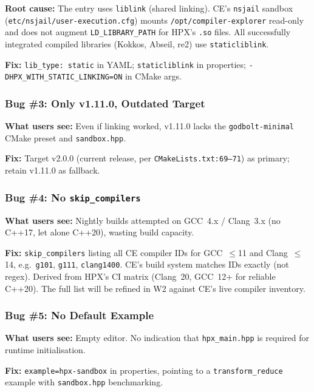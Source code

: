 \documentclass[11pt, a4paper]{article}
\newcommand{\code}[1]{\texttt{#1}}
\newcommand{\cefile}[1]{\texttt{#1}}
\begin{document}
\textbf{Root cause:} The entry uses \code{liblink} (shared linking).
CE's \code{nsjail} sandbox (\cefile{etc/nsjail/user-execution.cfg}) mounts
\code{/opt/compiler-explorer} read-only and does not augment
\code{LD\_LIBRARY\_PATH} for HPX's \code{.so} files.  All successfully
integrated compiled libraries (Kokkos, Abseil, re2) use \code{staticliblink}.

\textbf{Fix:} \code{lib\_type: static} in YAML; \code{staticliblink} in
properties; \code{-DHPX\_WITH\_STATIC\_LINKING=ON} in CMake args.

\subsubsection*{Bug \#3: Only v1.11.0, Outdated Target}

\textbf{What users see:} Even if linking worked, v1.11.0 lacks the
\code{godbolt-minimal} CMake preset and \cefile{sandbox.hpp}.

\textbf{Fix:} Target v2.0.0 (current release, per \cefile{CMakeLists.txt:69--71})
as primary; retain v1.11.0 as fallback.

\subsubsection*{Bug \#4: No \code{skip\_compilers}}

\textbf{What users see:} Nightly builds attempted on GCC~4.x / Clang~3.x
(no C++17, let alone C++20), wasting build capacity.

\textbf{Fix:} \code{skip\_compilers} listing all CE compiler IDs for
GCC~$\leq$11 and Clang~$\leq$14, e.g.\ \code{g101}, \code{g111},
\code{clang1400}.  CE's build system matches IDs exactly (not regex).
Derived from HPX's CI matrix (Clang~20, GCC~12+ for reliable C++20).
The full list will be refined in W2 against CE's live compiler inventory.

\subsubsection*{Bug \#5: No Default Example}

\textbf{What users see:} Empty editor.  No indication that
\code{hpx\_main.hpp} is required for runtime initialisation.

\textbf{Fix:} \code{example=hpx-sandbox} in properties, pointing to a
\code{transform\_reduce} example with \code{sandbox.hpp} benchmarking.
\end{document}
